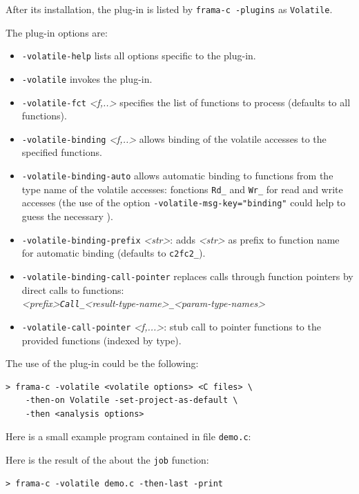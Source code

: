 \documentclass{frama-c-book}
\begin{document}
After its installation, the plug-in is listed by \verb|frama-c -plugins|
as \verb|Volatile|.

The plug-in options are:
\begin{itemize}{}
\item \verb|-volatile-help| lists all options specific to the plug-in.
\item \verb|-volatile| invokes the plug-in.
\item \verb|-volatile-fct| {\sl\/<f,..>} specifies the list of functions to process (defaults to all functions).
\item \verb|-volatile-binding| {\sl\/<f,..>} allows binding of the volatile accesses to the specified functions.
\item \verb|-volatile-binding-auto| allows automatic binding to functions from the type name of the volatile accesses: fonctions \verb|Rd_|{\sl\/<type-name>} and \verb|Wr_|{\sl\/<type-name>} for read and write accesses (the use of the option \verb|-volatile-msg-key="binding"| could help to guess the necessary {\sl <type-name>}).
\item \verb|-volatile-binding-prefix| {\sl <str>}: adds {\sl <str>} as prefix to function name for automatic binding (defaults to \verb|c2fc2_|).
\item \verb|-volatile-binding-call-pointer| replaces calls through function pointers by direct calls to functions:
  \\ {\sl <prefix>\verb|Call_|<result-type-name>\verb|_|<param-type-names>}
\item \verb|-volatile-call-pointer| {\sl <f,...>}:  stub call to pointer functions to the provided functions (indexed by type).
\end{itemize}

The use of the plug-in could be the following:

\begin{verbatim}
> frama-c -volatile <volatile options> <C files> \
    -then-on Volatile -set-project-as-default \
    -then <analysis options>
\end{verbatim}


Here is a small example \C program contained in file \verb|demo.c|:

Here is the result of the \plugin{} about the \verb|job| function:
\begin{lstlisting}[language=frama-c-commands, style=frama-c-style]
> frama-c -volatile demo.c -then-last -print
\end{lstlisting}
\end{document}
